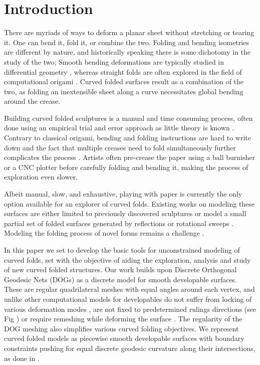 \section{Introduction}
There are myriads of ways to deform a planar sheet without stretching or tearing it. One can bend it, fold it, or combine the two. Folding and bending isometries are different by nature, and historically speaking there is some dichotomy in the study of the two; Smooth bending deformations are typically studied in differential geometry \cite{do_carmo}, whereas straight folds are often explored in the field of computational origami \cite{origami_book}. Curved folded surfaces \cite{huffman} result as a combination of the two, as folding an inextensible sheet along a curve necessitates global bending around the crease.

Building curved folded sculptures is a manual and time consuming process, often done using an empirical trial and error approach  as little theory is known \cite{curved_review,huffmann_reconstructing}. Contrary to classical origami, bending and folding instructions are hard to write down and the fact that multiple creases need to fold simultaneously further complicates the process \cite{StringActuated:2017}. Artists often pre-crease the paper using a ball burnisher or a CNC plotter before carefully folding and bending it, making the process of exploration even slower. 

Albeit manual, slow, and exhaustive, playing with paper is currently the only option available for an explorer of curved folds. Existing works on modeling these surfaces are either limited to previously discovered sculptures \cite{curved_folding_kilian,StringActuated:2017} or model a small partial set of folded surfaces generated by reflections or rotational sweeps \cite{Mitani_ref,mitani2009design}. Modeling the folding process of novel forms remains a challenge \cite{curved_review}. 

In this paper we set to develop the basic tools for unconstrained modeling of curved folds, set with the objective of aiding the exploration, analysis and study of new curved folded structures. Our work builds upon Discrete Orthogonal Geodesic Nets (DOGs) \cite{rabi18,rabi2018shape} as a discrete model for smooth developable surfaces. These are regular quadrilateral meshes with equal angles around each vertex, and unlike other computational models for developables do not suffer from locking of various deformation modes \cite{locking1,locking2,grin_shells}, are not fixed to predetermined rulings directions \cite{pottmann_new,curved_folding_kilian} (see Fig ) or require remeshing while deforming the surface \cite{StringActuated:2017,SchreckEG2017,Narain}. The regularity of the DOG meshing also simplifies various curved folding objectives. We represent curved folded models as piecewise smooth developable surfaces with boundary constraints pushing for equal discrete geodesic curvature along their intersections, as done in \cite{rabi2018shape}.

